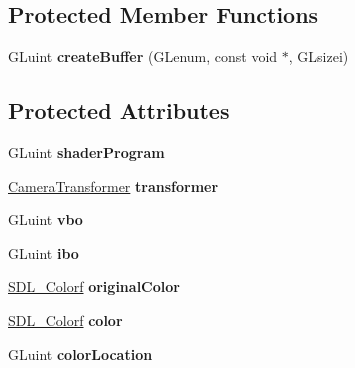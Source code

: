 \subsection*{Protected Member Functions}
\begin{DoxyCompactItemize}
\item 
\hypertarget{class_primitive3d_a1be91e8b49bdfbb9699568eb4a923018}{G\-Luint {\bfseries create\-Buffer} (G\-Lenum, const void $\ast$, G\-Lsizei)}\label{class_primitive3d_a1be91e8b49bdfbb9699568eb4a923018}

\end{DoxyCompactItemize}
\subsection*{Protected Attributes}
\begin{DoxyCompactItemize}
\item 
\hypertarget{class_primitive3d_a1cca9d57e9f85da2a5fb3ba6bc64f966}{G\-Luint {\bfseries shader\-Program}}\label{class_primitive3d_a1cca9d57e9f85da2a5fb3ba6bc64f966}

\item 
\hypertarget{class_primitive3d_a2cc28cb51b24713f4113aee253d72dd8}{\hyperlink{class_camera_transformer}{Camera\-Transformer} {\bfseries transformer}}\label{class_primitive3d_a2cc28cb51b24713f4113aee253d72dd8}

\item 
\hypertarget{class_primitive3d_ae323060c671b872896598cfc50170f03}{G\-Luint {\bfseries vbo}}\label{class_primitive3d_ae323060c671b872896598cfc50170f03}

\item 
\hypertarget{class_primitive3d_ad60f54ea5730cb3fb5fe01d3d21811c5}{G\-Luint {\bfseries ibo}}\label{class_primitive3d_ad60f54ea5730cb3fb5fe01d3d21811c5}

\item 
\hypertarget{class_primitive3d_aecf62c645d724d8d1d4d368cf0aba47b}{\hyperlink{struct_s_d_l___colorf}{S\-D\-L\-\_\-\-Colorf} {\bfseries original\-Color}}\label{class_primitive3d_aecf62c645d724d8d1d4d368cf0aba47b}

\item 
\hypertarget{class_primitive3d_a2bbf241e8bf06981b1e0b12d11841295}{\hyperlink{struct_s_d_l___colorf}{S\-D\-L\-\_\-\-Colorf} {\bfseries color}}\label{class_primitive3d_a2bbf241e8bf06981b1e0b12d11841295}

\item 
\hypertarget{class_primitive3d_a0201c258060263069ebe8561408100d0}{G\-Luint {\bfseries color\-Location}}\label{class_primitive3d_a0201c258060263069ebe8561408100d0}


\end{DoxyCompactItemize}
